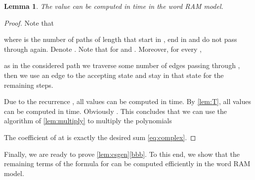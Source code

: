 \documentclass{article}
\newtheorem{lemma}[theorem]{Lemma}
\theoremstyle{definition}
\theoremstyle{remark}
\begin{document}
\begin{lemma}\label{lem:complex}
  The value  can be computed in  time in the word RAM model.
\end{lemma}
\begin{proof}
  Note that
  
  where  is the number of paths of length  that start in , end in  and do not pass through  again.
  Denote . Note that  for  and .
  Moreover, for every ,
  
  as in the considered path we traverse some number of edges  passing through ,
  then we use an edge to the accepting state and stay in that state for the remaining  steps.

  Due to the recurrence , all values  can be computed in  time.
  By \cref{lem:T}, all values  can be computed in  time.
  Obviously .
  This concludes that we can use the algorithm of \cref{lem:multiply} to multiply
  the polynomials
  
  The coefficient of  at  is exactly the desired sum \eqref{eq:complex}.
\end{proof}

Finally, we are ready to prove \cref{lem:csgen}\ref{bbb}. To this end, we show that the remaining terms of the formula for  can be computed efficiently in the word RAM model.
\end{document}
